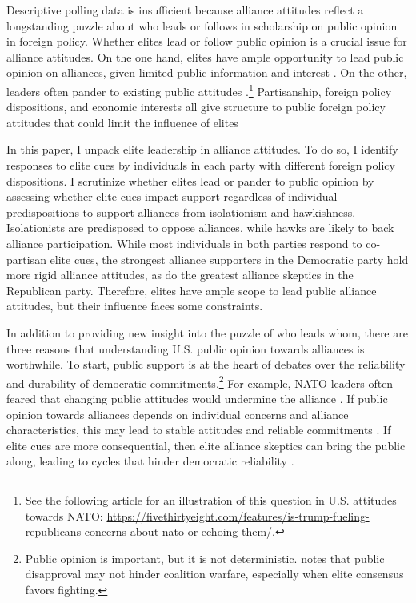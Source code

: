 \documentclass[12pt]{article}
\begin{document}
Descriptive polling data is insufficient because alliance attitudes reflect a longstanding puzzle about who leads or follows in scholarship on public opinion in foreign policy.
Whether elites lead or follow public opinion is a crucial issue for alliance attitudes. 
On the one hand, elites have ample opportunity to lead public opinion on alliances, given limited public information and interest \citep{Canes-Wrone2006, Druckman2014}.
On the other, leaders often pander to existing public attitudes \citep{Barberaetal2019, HagerHilbig2020}.\footnote{See the following article for an illustration of this question in U.S. attitudes towards NATO: \url{https://fivethirtyeight.com/features/is-trump-fueling-republicans-concerns-about-nato-or-echoing-them/}.}
Partisanship, foreign policy dispositions, and economic interests all give structure to public foreign policy attitudes that could limit the influence of elites \citep{Holsti1992, PageShapiro1992, KertzerZeitzoff2017}


In this paper, I unpack elite leadership in alliance attitudes. 
To do so, I identify responses to elite cues by individuals in each party with different foreign policy dispositions.
I scrutinize whether elites lead or pander to public opinion by assessing whether elite cues impact support regardless of individual predispositions to support alliances from isolationism and hawkishness.  
Isolationists are predisposed to oppose alliances, while hawks are likely to back alliance participation. 
While most individuals in both parties respond to co-partisan elite cues, the strongest alliance supporters in the Democratic party hold more rigid alliance attitudes, as do the greatest alliance skeptics in the Republican party. 
Therefore, elites have ample scope to lead public alliance attitudes, but their influence faces some constraints. 


In addition to providing new insight into the puzzle of who leads whom, there are three reasons that understanding U.S. public opinion towards alliances is worthwhile. 
To start, public support is at the heart of debates over the reliability and durability of democratic commitments.\footnote{Public opinion is important, but it is not deterministic. \citet{Kreps2010} notes that public disapproval may not hinder coalition warfare, especially when elite consensus favors fighting.}
For example, NATO leaders often feared that changing public attitudes would undermine the alliance \citep{Sayle2019}.   
If public opinion towards alliances depends on individual concerns and alliance characteristics, this may lead to stable attitudes and reliable commitments \citep{Gaubatz1996}.
If elite cues are more consequential, then elite alliance skeptics can bring the public along, leading to cycles that hinder democratic reliability \citep{GartzkeGleditsch2004}.
\end{document}
